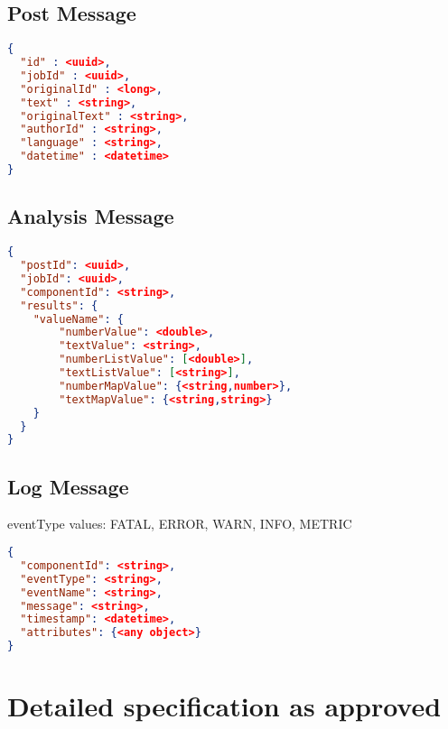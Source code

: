 \subsection{Post Message}\label{subsection:postmessage}

\begin{lstlisting}[language=json,firstnumber=1]
{
  "id" : <uuid>,
  "jobId" : <uuid>,
  "originalId" : <long>,
  "text" : <string>,
  "originalText" : <string>,
  "authorId" : <string>,
  "language" : <string>,
  "datetime" : <datetime>
}
\end{lstlisting}

\subsection{Analysis Message}\label{section:analysisMessage}

\begin{lstlisting}[language=json,firstnumber=1]
{
  "postId": <uuid>,
  "jobId": <uuid>,
  "componentId": <string>,
  "results": {
    "valueName": {
        "numberValue": <double>,
        "textValue": <string>,
        "numberListValue": [<double>],
        "textListValue": [<string>],
        "numberMapValue": {<string,number>},
        "textMapValue": {<string,string>}
    }
  }
}
\end{lstlisting}

\subsection{Log Message}\label{section:logMessage}

eventType values: FATAL, ERROR, WARN, INFO, METRIC

\begin{lstlisting}[language=json,firstnumber=1]
{
  "componentId": <string>,
  "eventType": <string>,
  "eventName": <string>,
  "message": <string>,
  "timestamp": <datetime>,
  "attributes": {<any object>}
}
\end{lstlisting}
\newpage
\section{Detailed specification as approved}

